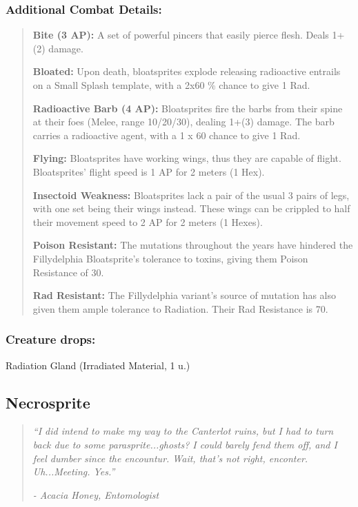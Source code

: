 \documentclass[11pt,a4paper,twocolumn]{book}
\begin{document}
	\subsubsection*{Additional Combat Details:}
	\begin{verse}
		\textbf{Bite (3 AP):} A set of powerful pincers that easily pierce flesh. Deals 1+(2) damage. 
		
		\textbf{Bloated:} Upon death, bloatsprites explode releasing radioactive entrails on a Small Splash template, with a 2x60 \%  chance to give 1 Rad.
		
		\textbf{Radioactive Barb (4 AP):} Bloatsprites fire the barbs from their spine at their foes (Melee, range 10/20/30), dealing 1+(3) damage. The barb carries a radioactive agent, with a 1 x 60 chance to give 1 Rad. 
		
		\textbf{Flying:} Bloatsprites have working wings, thus they are capable of flight. Bloatsprites' flight speed is 1 AP for 2 meters (1 Hex).
		
		\textbf{Insectoid Weakness:} Bloatsprites lack a pair of the usual 3 pairs of legs, with one set being their wings instead. These wings can be crippled to half their movement speed to 2 AP for 2 meters (1 Hexes).
		
		\textbf{Poison Resistant: }The mutations throughout the years have hindered the Fillydelphia Bloatsprite's tolerance to toxins, giving them Poison Resistance of 30.
		
		\textbf{Rad Resistant:} The Fillydelphia variant's source of mutation has also given them ample tolerance to Radiation. Their Rad Resistance is 70.
	\end{verse}
	
	\subsubsection*{Creature drops:}
	Radiation Gland (Irradiated Material, 1 u.)
	\vfill
	
	\subsection*{Necrosprite}
	\begin{quote}
		\emph{``I did intend to make my way to the Canterlot ruins, but I had to turn back due to some parasprite...ghosts? I could barely fend them off, and I feel dumber since the encountur. Wait, that's not right, enconter. Uh...Meeting. Yes.''}
		
		\emph{-	Acacia Honey, Entomologist}
	\end{quote}
	
\end{document}
